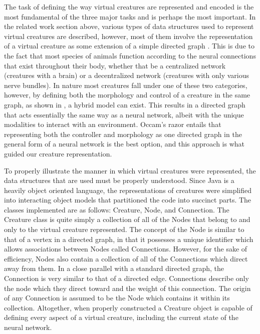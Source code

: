 \documentclass[12pt]{article}
\begin{document}
The task of defining the way virtual creatures are represented and encoded is the most fundamental of the three major tasks and is perhaps the most important.
In the related work section above, various types of data structures used to represent virtual creatures are described, however, most of them involve the representation of a virtual creature as some extension of a simple directed graph \cite{sims1994evolving} \cite{hornby2001evolving} \cite{krcah2007evolutionary} \cite{lehman2011evolving}.
This is due to the fact that most species of animals function according to the neural connections that exist throughout their body, whether that be a centralized network (creatures with a brain) or a decentralized network (creatures with only various nerve bundles).
In nature most creatures fall under one of these two categories, however, by defining both the morphology and control of a creature in the same graph, as shown in \cite{lehman2011evolving}, a hybrid model can exist.
This results in a directed graph that acts essentially the same way as a neural network, albeit with the unique modalities to interact with an environment.
Occam’s razor entails that representing both the controller and morphology as one directed graph in the general form of a neural network is the best option, and this approach is what guided our creature representation.

To properly illustrate the manner in which virtual creatures were represented, the data structures that are used must be properly understood.
Since Java is a heavily object oriented language, the representations of creatures were simplified into interacting object models that partitioned the code into succinct parts.
The classes implemented are as follows: Creature, Node, and Connection.
The Creature class is quite simply a collection of all of the Nodes that belong to and only to the virtual creature represented.
The concept of the Node is similar to that of a vertex in a directed graph, in that it possesses a unique identifier which allows associations between Nodes called Connections.
However, for the sake of efficiency, Nodes also contain a collection of all of the Connections which direct away from them.
In a close parallel with a standard directed graph, the Connection is very similar to that of a directed edge.
Connections describe only the node which they direct toward and the weight of this connection.
The origin of any Connection is assumed to be the Node which contains it within its collection.
Altogether, when properly constructed a Creature object is capable of defining every aspect of a virtual creature, including the current state of the neural network.
\end{document}
